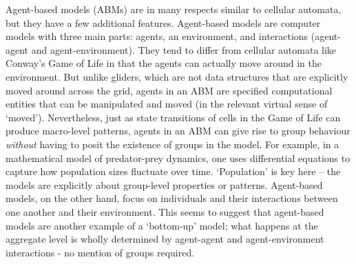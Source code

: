 \documentclass[11pt]{article}
\begin{document}
Agent-based models (ABMs) are in many respects similar to cellular automata, but they have a few additional features.  Agent-based models are computer models with three main parts: agents, an environment, and interactions (agent-agent and agent-environment). They tend to differ from cellular automata like Conway's Game of Life in that the agents can actually move around in the environment. But unlike gliders, which are not data structures that are explicitly moved around across the grid, agents in an ABM are specified computational entities that can be manipulated and moved (in the relevant virtual sense of `moved'). Nevertheless, just as state transitions of cells in the Game of Life can produce macro-level patterns, agents in an ABM can give rise to group behaviour \emph{without} having to posit the existence of groups in the model.  For example, in a mathematical model of predator-prey dynamics, one uses differential equations to capture how population sizes fluctuate over time. `Population' is key here -- the models are explicitly about group-level properties or patterns. Agent-based models, on the other hand, focus on individuals and their interactions between one another and their environment.  This seems to suggest that agent-based models are another example of a `bottom-up' model; what happens at the aggregate level is wholly determined by agent-agent and agent-environment interactions - no mention of groups required.
\end{document}

